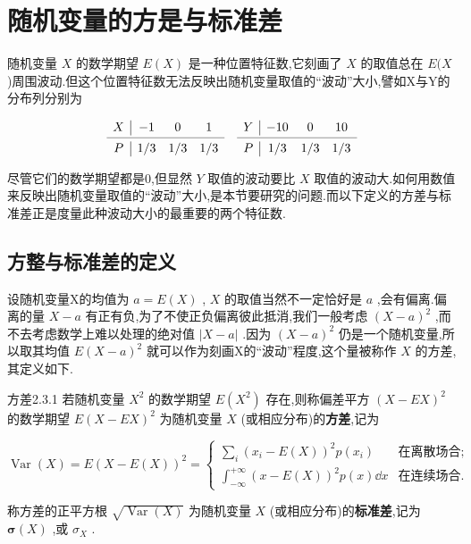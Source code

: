 \section{随机变量的方是与标准差}\label{sec:2.3}


随机变量 $ X $ 的数学期望 $ E(X) $ 是一种位置特征数,它刻画了 $ X $ 的取值总在 $ E(X $ )周围波动.但这个位置特征数无法反映出随机变量取值的“波动”大小,譬如X与Y的分布列分别为

\[
\begin{array}{c|ccccc|ccc}
X     & -1    & 0     & 1     &       & Y     & -10   & 0     & 10 \\
\cmidrule{1-4}\cmidrule{6-9}    P     & 1/3   & 1/3   & 1/3   &       & P     & 1/3   & 1/3   & 1/3 \\
\end{array}\]

尽管它们的数学期望都是0,但显然 $ Y $ 取值的波动要比 $ X $ 取值的波动大.如何用数值来反映出随机变量取值的“波动”大小,是本节要研究的问题.而以下定义的方差与标准差正是度量此种波动大小的最重要的两个特征数.

\subsection{方整与标准差的定义}\label{2.3.1}

设随机变量X的均值为 $ a=E(X) $ , $ X $ 的取值当然不一定恰好是 $ a $ ,会有偏离.偏离的量 $ X-a $ 有正有负,为了不使正负偏离彼此抵消,我们一般考虑 $ (X-a)^2 $ ,而不去考虑数学上难以处理的绝对值 $ |X-a| $ .因为 $ (X-a)^2 $ 仍是一个随机变量,所以取其均值 $ E(X-a)^2 $ 就可以作为刻画X的“波动”程度,这个量被称作 $ X $ 的方差,其定义如下.
\begin{definition}{方差}{2.3.1}
	若随机变量 $ X^2 $ 的数学期望 $ E(X^2) $ 存在,则称偏差平方 $ (X-EX)^2 $ 的数学期望 $ E(X-EX)^2 $ 为随机变量 $ X $ (或相应分布)的\textbf{方差},记为
	
	\begin{equation}
	\operatorname{Var}(X)=E(X-E(X))^{2}=\left\{\begin{array}{ll}
	{\sum_{i}\left(x_{i}-E(X)\right)^{2} p\left(x_{i}\right)} &{\text{在离散场合;}}\\
	{\int_{-\infty}^{+\infty}(x-E(X))^{2} p(x) \dd x} &{\text{在连续场合.}}
	\end{array}\right. \label{eq:2.3.1}
	\end{equation}
	
	称方差的正平方根 $ \sqrt{\operatorname{Var}(X)} $ 为随机变量 $ X $ (或相应分布)的\textbf{标准差},记为 $ \boldsymbol{\sigma}(X) $ ,或 $ \sigma_X $ .
\end{definition}



